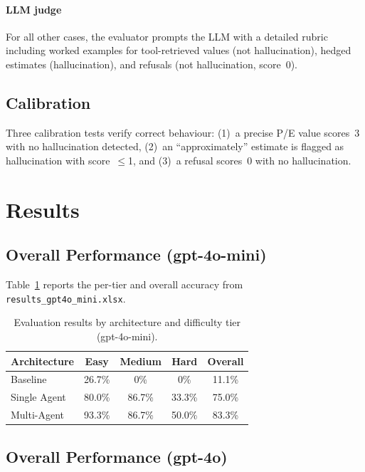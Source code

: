 \documentclass[conference]{IEEEtran}
\begin{document}
\paragraph{LLM judge}
For all other cases, the evaluator prompts the LLM with a detailed rubric including
worked examples for tool-retrieved values (not hallucination), hedged estimates
(hallucination), and refusals (not hallucination, score~0).

\subsection{Calibration}

Three calibration tests verify correct behaviour:
(1)~a precise P/E value scores~3 with no hallucination detected,
(2)~an ``approximately'' estimate is flagged as hallucination with score~$\leq$1, and
(3)~a refusal scores~0 with no hallucination.

\section{Results}

\subsection{Overall Performance (gpt-4o-mini)}

Table~\ref{tab:mini} reports the per-tier and overall accuracy from
\texttt{results\_gpt4o\_mini.xlsx}.

\begin{table}[H]
\centering
\caption{Evaluation results by architecture and difficulty tier (gpt-4o-mini).}
\label{tab:mini}
\begin{tabular}{lcccc}
\toprule
\textbf{Architecture} & \textbf{Easy} & \textbf{Medium} & \textbf{Hard} & \textbf{Overall} \\
\midrule
Baseline      & 26.7\% & 0\%    & 0\%    & 11.1\% \\
Single Agent  & 80.0\% & 86.7\% & 33.3\% & 75.0\% \\
Multi-Agent   & 93.3\% & 86.7\% & 50.0\% & 83.3\% \\
\bottomrule
\end{tabular}
\end{table}

\subsection{Overall Performance (gpt-4o)}
\end{document}
